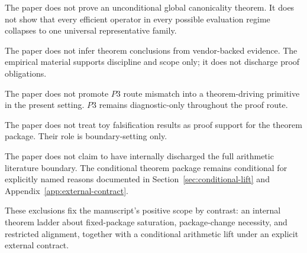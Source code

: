 \documentclass[11pt]{article}
\begin{document}
The paper does not prove an unconditional global canonicality theorem. It does not show that every efficient operator in every possible evaluation regime collapses to one universal representative family.

The paper does not infer theorem conclusions from vendor-backed evidence. The empirical material supports discipline and scope only; it does not discharge proof obligations.

The paper does not promote \(P3\) route mismatch into a theorem-driving primitive in the present setting. \(P3\) remains diagnostic-only throughout the proof route.

The paper does not treat toy falsification results as proof support for the theorem package. Their role is boundary-setting only.

The paper does not claim to have internally discharged the full arithmetic literature boundary. The conditional theorem package remains conditional for explicitly named reasons documented in Section~\ref{sec:conditional-lift} and Appendix~\ref{app:external-contract}.

These exclusions fix the manuscript's positive scope by contrast: an internal theorem ladder about fixed-package saturation, package-change necessity, and restricted alignment, together with a conditional arithmetic lift under an explicit external contract.
 


\end{document}

